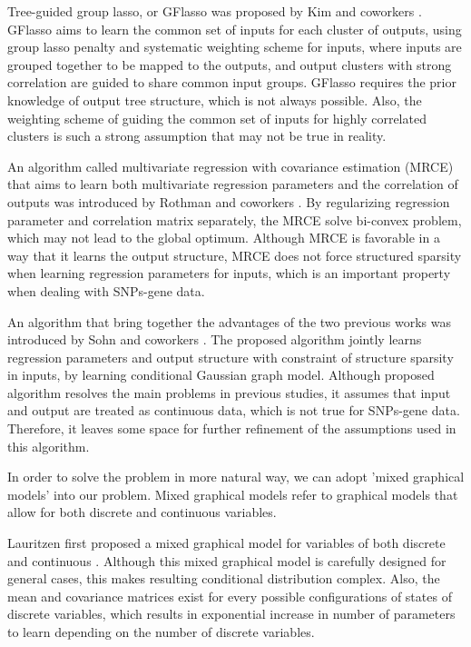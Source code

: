 \documentclass{article}
\begin{document}
Tree-guided group lasso, or GFlasso was proposed by Kim and coworkers \cite{kim2010tree}.
GFlasso aims to learn the common set of inputs for each cluster of outputs, using group lasso penalty and systematic weighting scheme for inputs, where inputs are grouped together to be mapped to the outputs, and output clusters with strong correlation are guided to share common input groups.
GFlasso requires the prior knowledge of output tree structure, which is not always possible.
Also, the weighting scheme of guiding the common set of inputs for highly correlated clusters is such a strong assumption that may not be true in reality.


An algorithm called multivariate regression with covariance estimation (MRCE) that aims to learn both multivariate regression parameters and the correlation of outputs was introduced by Rothman and coworkers \cite{rothman2010sparse}.
By regularizing regression parameter and correlation matrix separately, the MRCE solve bi-convex problem, which may not lead to the global optimum. Although MRCE is favorable in a way that it learns the output structure, MRCE does not force structured sparsity when learning regression parameters for inputs, which is an important property when dealing with SNPs-gene data.


An algorithm that bring together the advantages of the two previous works \cite{kim2010tree} \cite{rothman2010sparse} was introduced by Sohn and coworkers \cite{sohn2012joint}. 
The proposed algorithm jointly learns regression parameters and output structure with constraint of structure sparsity in inputs, by learning conditional Gaussian graph model.
Although proposed algorithm resolves the main problems in previous studies, it assumes that input and output are treated as continuous data, which is not true for SNPs-gene data.
Therefore, it leaves some space for further refinement of the assumptions used in this algorithm.









In order to solve the problem in more natural way, we can adopt 'mixed graphical models' into our problem.
Mixed graphical models refer to graphical models that allow for both discrete and continuous variables.


Lauritzen first proposed a mixed graphical model for variables of both discrete and continuous \cite{lauritzen1989graphical}.
 Although this mixed graphical model is carefully designed for general cases, this makes resulting conditional distribution complex. Also, the mean and covariance matrices exist for every possible configurations of states of discrete variables, which results in exponential increase in number of parameters to learn depending on the number of discrete variables.
\end{document}
